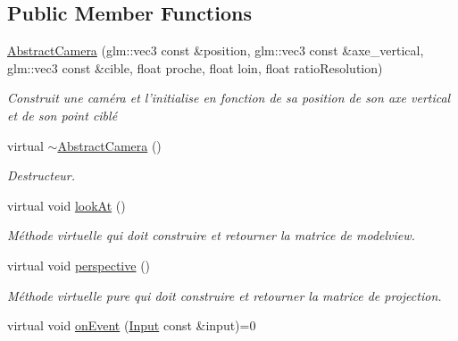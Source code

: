 \subsection*{Public Member Functions}
\begin{DoxyCompactItemize}
\item 
\hypertarget{classAbstractCamera_a880ce099ca5cba2cb9baada64fb605b5}{\hyperlink{classAbstractCamera_a880ce099ca5cba2cb9baada64fb605b5}{Abstract\-Camera} (glm\-::vec3 const \&position, glm\-::vec3 const \&axe\-\_\-vertical, glm\-::vec3 const \&cible, float proche, float loin, float ratio\-Resolution)}\label{classAbstractCamera_a880ce099ca5cba2cb9baada64fb605b5}

\begin{DoxyCompactList}\small\item\em Construit une caméra et l'initialise en fonction de sa position de son axe vertical et de son point ciblé \end{DoxyCompactList}\item 
\hypertarget{classAbstractCamera_addf550f9f41d04bd6651b19d795bdabe}{virtual \hyperlink{classAbstractCamera_addf550f9f41d04bd6651b19d795bdabe}{$\sim$\-Abstract\-Camera} ()}\label{classAbstractCamera_addf550f9f41d04bd6651b19d795bdabe}

\begin{DoxyCompactList}\small\item\em Destructeur. \end{DoxyCompactList}\item 
\hypertarget{classAbstractCamera_a12f6c58003bece7aa6cb66108a1cbeb1}{virtual void \hyperlink{classAbstractCamera_a12f6c58003bece7aa6cb66108a1cbeb1}{look\-At} ()}\label{classAbstractCamera_a12f6c58003bece7aa6cb66108a1cbeb1}

\begin{DoxyCompactList}\small\item\em Méthode virtuelle qui doit construire et retourner la matrice de modelview. \end{DoxyCompactList}\item 
\hypertarget{classAbstractCamera_a7d34830e280d6c40ce3ff22583054880}{virtual void \hyperlink{classAbstractCamera_a7d34830e280d6c40ce3ff22583054880}{perspective} ()}\label{classAbstractCamera_a7d34830e280d6c40ce3ff22583054880}

\begin{DoxyCompactList}\small\item\em Méthode virtuelle pure qui doit construire et retourner la matrice de projection. \end{DoxyCompactList}\item 
\hypertarget{classAbstractCamera_a5dab83f71c638eda31fc49db01f47180}{virtual void \hyperlink{classAbstractCamera_a5dab83f71c638eda31fc49db01f47180}{on\-Event} (\hyperlink{classInput}{Input} const \&input)=0}\label{classAbstractCamera_a5dab83f71c638eda31fc49db01f47180}


\end{DoxyCompactItemize}
